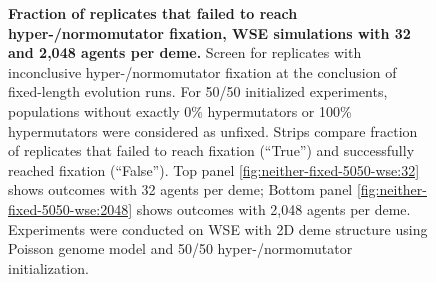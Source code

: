 \begin{figure}[h]
  \begin{minipage}{\textwidth}
    \caption{%
\textbf{Fraction of replicates that failed to reach hyper-/normomutator fixation, WSE simulations with 32 and 2,048 agents per deme.}
\footnotesize
Screen for replicates with inconclusive hyper-/normomutator fixation at the conclusion of fixed-length evolution runs.
For 50/50 initialized experiments, populations without exactly 0\% hypermutators or 100\% hypermutators were considered as unfixed.
Strips compare fraction of replicates that failed to reach fixation (``True'') and successfully reached fixation (``False'').
Top panel \ref{fig:neither-fixed-5050-wse:32} shows outcomes with 32 agents per deme;
Bottom panel \ref{fig:neither-fixed-5050-wse:2048} shows outcomes with 2,048 agents per deme.
Experiments were conducted on WSE with 2D deme structure using Poisson genome model and 50/50 hyper-/normomutator initialization.
    }
    \label{fig:neither-fixed-5050-wse}
  \end{minipage}
\end{figure}
